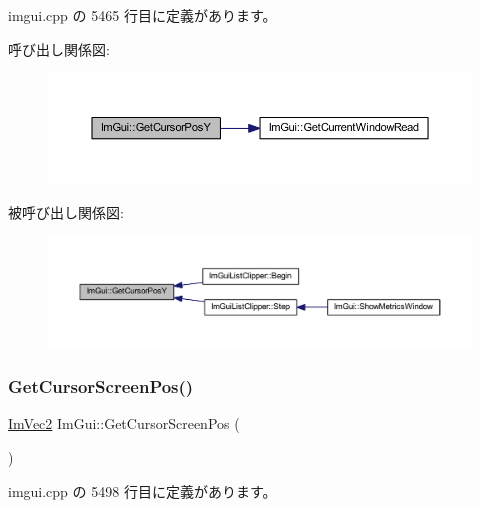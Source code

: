  imgui.\+cpp の 5465 行目に定義があります。

呼び出し関係図\+:\nopagebreak
\begin{figure}[H]
\begin{center}
\leavevmode
\includegraphics[width=350pt]{namespace_im_gui_a86e409551f256b542166989c558d41c1_cgraph}
\end{center}
\end{figure}
被呼び出し関係図\+:\nopagebreak
\begin{figure}[H]
\begin{center}
\leavevmode
\includegraphics[width=350pt]{namespace_im_gui_a86e409551f256b542166989c558d41c1_icgraph}
\end{center}
\end{figure}
\mbox{\label{namespace_im_gui_adb0db3c1ee36f5085f35890a4229ae75}} 
\subsubsection{\texorpdfstring{Get\+Cursor\+Screen\+Pos()}{GetCursorScreenPos()}}
{\footnotesize\ttfamily \mbox{\hyperlink{struct_im_vec2}{Im\+Vec2}} Im\+Gui\+::\+Get\+Cursor\+Screen\+Pos (\begin{DoxyParamCaption}{ }\end{DoxyParamCaption})}



 imgui.\+cpp の 5498 行目に定義があります。

